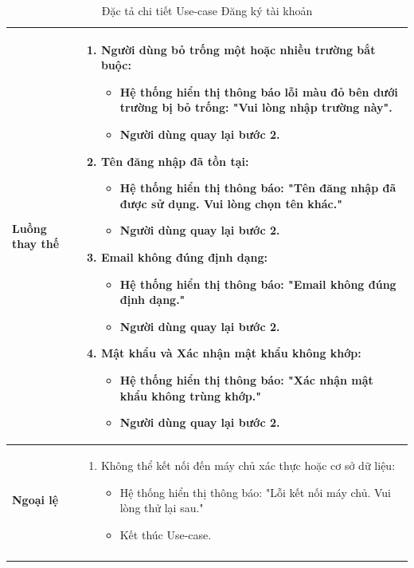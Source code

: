\begin{longtable}{|p{}|p{}|}
\textbf{Luồng thay thế} &
\vspace{-\baselineskip}
\begin{enumerate}[topsep=2pt, itemsep=0pt]
    \item[2a.] Người dùng bỏ trống một hoặc nhiều trường bắt buộc:
    \begin{itemize}[topsep=0pt, itemsep=0pt]
        \item Hệ thống hiển thị thông báo lỗi màu đỏ bên dưới trường bị bỏ trống: "Vui lòng nhập trường này".
        \item Người dùng quay lại bước 2.
    \end{itemize}
    \item[4a.] Tên đăng nhập đã tồn tại:
    \begin{itemize}[topsep=0pt, itemsep=0pt]
        \item Hệ thống hiển thị thông báo: "Tên đăng nhập đã được sử dụng. Vui lòng chọn tên khác."
        \item Người dùng quay lại bước 2.
    \end{itemize}
    \item[4b.] Email không đúng định dạng:
    \begin{itemize}[topsep=0pt, itemsep=0pt]
        \item Hệ thống hiển thị thông báo: "Email không đúng định dạng."
        \item Người dùng quay lại bước 2.
    \end{itemize}
    \item[4c.] Mật khẩu và Xác nhận mật khẩu không khớp:
    \begin{itemize}[topsep=0pt, itemsep=0pt]
        \item Hệ thống hiển thị thông báo: "Xác nhận mật khẩu không trùng khớp."
        \item Người dùng quay lại bước 2.
    \end{itemize}
\end{enumerate} \\
\hline
\textbf{Ngoại lệ} &
\vspace{-\baselineskip}
\begin{enumerate}[topsep=2pt, itemsep=0pt]
    \item[5a.] Không thể kết nối đến máy chủ xác thực hoặc cơ sở dữ liệu:
    \begin{itemize}[topsep=0pt, itemsep=0pt]
        \item Hệ thống hiển thị thông báo: "Lỗi kết nối máy chủ. Vui lòng thử lại sau."
        \item Kết thúc Use-case.
    \end{itemize}
\end{enumerate} \\
\hline
\caption{Đặc tả chi tiết Use-case Đăng ký tài khoản}
\label{table:uc-register}
\end{longtable}

